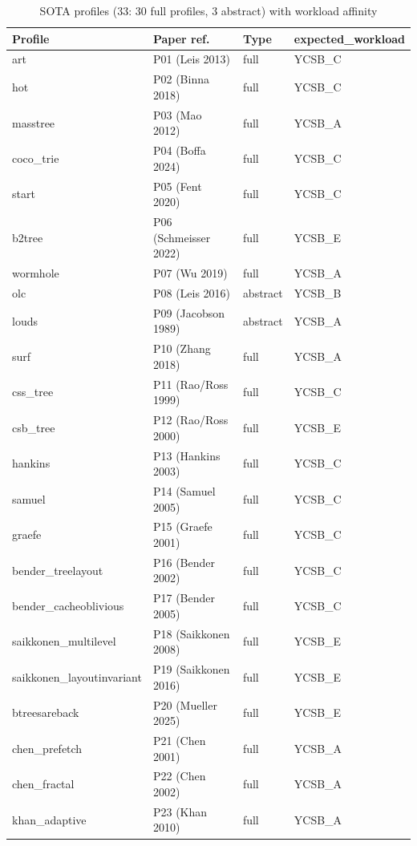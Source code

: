 \begin{nurlang}
\begin{table}[!htbp]
  \caption{SOTA profiles (33: 30 full profiles, 3 abstract) with workload affinity}\label{tab:sota-profiles}
  \centering\small
  \begin{tabular}{llll}
    \toprule
    \textbf{Profile} & \textbf{Paper ref.} & \textbf{Type} & \textbf{expected\_workload} \\
    \midrule
    art & P01 (Leis 2013) & full & YCSB\_C \\
    hot & P02 (Binna 2018) & full & YCSB\_C \\
    masstree & P03 (Mao 2012) & full & YCSB\_A \\
    coco\_trie & P04 (Boffa 2024) & full & YCSB\_C \\
    start & P05 (Fent 2020) & full & YCSB\_C \\
    b2tree & P06 (Schmeisser 2022) & full & YCSB\_E \\
    wormhole & P07 (Wu 2019) & full & YCSB\_A \\
    olc & P08 (Leis 2016) & abstract & YCSB\_B \\
    louds & P09 (Jacobson 1989) & abstract & YCSB\_A \\
    surf & P10 (Zhang 2018) & full & YCSB\_A \\
    css\_tree & P11 (Rao/Ross 1999) & full & YCSB\_C \\
    csb\_tree & P12 (Rao/Ross 2000) & full & YCSB\_E \\
    hankins & P13 (Hankins 2003) & full & YCSB\_C \\
    samuel & P14 (Samuel 2005) & full & YCSB\_C \\
    graefe & P15 (Graefe 2001) & full & YCSB\_C \\
    bender\_treelayout & P16 (Bender 2002) & full & YCSB\_C \\
    bender\_cacheoblivious & P17 (Bender 2005) & full & YCSB\_C \\
    saikkonen\_multilevel & P18 (Saikkonen 2008) & full & YCSB\_E \\
    saikkonen\_layoutinvariant & P19 (Saikkonen 2016) & full & YCSB\_E \\
    btreesareback & P20 (Mueller 2025) & full & YCSB\_E \\
    chen\_prefetch & P21 (Chen 2001) & full & YCSB\_A \\
    chen\_fractal & P22 (Chen 2002) & full & YCSB\_A \\
    khan\_adaptive & P23 (Khan 2010) & full & YCSB\_A \\

\end{tabular}
\end{table}
\end{nurlang}
